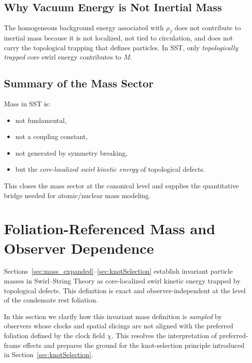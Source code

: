 \documentclass[10pt]{article}
\newcommand{\rhof}{\rho_{\!f}}                           %
\begin{document}
    \subsection{Why Vacuum Energy is Not Inertial Mass}

        The homogeneous background energy associated with $\rhof$ does not contribute to
        inertial mass because it is not localized, not tied to circulation, and does not
        carry the topological trapping that defines particles. In SST, only
        \emph{topologically trapped} core swirl energy contributes to $M$.

    \subsection{Summary of the Mass Sector}

        Mass in SST is:
        \begin{itemize}
            \item not fundamental,
            \item not a coupling constant,
            \item not generated by symmetry breaking,
            \item but the \emph{core-localized swirl kinetic energy} of topological defects.
        \end{itemize}

        This closes the mass sector at the canonical level and supplies the quantitative
        bridge needed for atomic/nuclear mass modeling.

    \section{Foliation-Referenced Mass and Observer Dependence}
    \label{sec:foliation_mass}

    Sections~\ref{sec:mass_expanded}--\ref{sec:knotSelection} establish invariant particle masses in Swirl--String Theory
    as core-localized swirl kinetic energy trapped by topological defects.
    This definition is exact and observer-independent at the level of the
    condensate rest foliation.

    In this section we clarify how this invariant mass definition is
    \emph{sampled} by observers whose clocks and spatial slicings are
    not aligned with the preferred foliation defined by the clock field $\chi$.
    This resolves the interpretation of preferred-frame effects and
    prepares the ground for the knot-selection principle introduced in
    Section~\ref{sec:knotSelection}.
\end{document}
